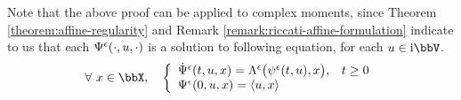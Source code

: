 \begin{remark}
  \label{remark:aff-asymptotics}
  Note that the above proof can be applied to complex moments, since Theorem \ref{theorem:affine-regularity} and Remark \ref{remark:riccati-affine-formulation} indicate to us that each $\Psi^\epsilon(\cdot,u, \cdot)$ is a solution to following equation, for each $\momentVar \in \im\vecSpace$.
  \begin{equation*}
    \forall~\stateVar\in\stateSpace, \quad \left\{\begin{array}{ll}
      \dot\aff^\epsilon(t,\momentVar,\stateVar) = \ode^\epsilon\big(\affPart^\epsilon(t, \momentVar), \stateVar\big), & t \geq 0 \\
      \aff^\epsilon(0,\momentVar,\stateVar) = \prj\momentVar\stateVar
    \end{array}\right.
  \end{equation*}
\end{remark}
